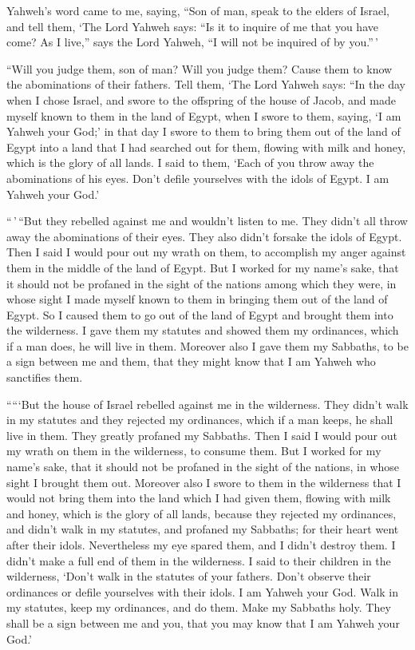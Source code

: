  Yahweh's word came to me, saying,  ``Son of
man, speak to the elders of Israel, and tell them, `The Lord Yahweh
says: ``Is it to inquire of me that you have come? As I live,'' says the
Lord Yahweh, ``I will not be inquired of by you.''\,'

 ``Will you judge them, son of man? Will you judge them?
Cause them to know the abominations of their fathers. 
Tell them, `The Lord Yahweh says: ``In the day when I chose Israel, and
swore to the offspring of the house of Jacob, and made myself known to
them in the land of Egypt, when I swore to them, saying, `I am Yahweh
your God;'  in that day I swore to them to bring them out
of the land of Egypt into a land that I had searched out for them,
flowing with milk and honey, which is the glory of all lands.
 I said to them, `Each of you throw away the abominations
of his eyes. Don't defile yourselves with the idols of Egypt. I am
Yahweh your God.'

 ``\,'\,``But they rebelled against me and wouldn't listen
to me. They didn't all throw away the abominations of their eyes. They
also didn't forsake the idols of Egypt. Then I said I would pour out my
wrath on them, to accomplish my anger against them in the middle of the
land of Egypt.  But I worked for my name's sake, that it
should not be profaned in the sight of the nations among which they
were, in whose sight I made myself known to them in bringing them out of
the land of Egypt.  So I caused them to go out of the
land of Egypt and brought them into the wilderness.  I
gave them my statutes and showed them my ordinances, which if a man
does, he will live in them.  Moreover also I gave them my
Sabbaths, to be a sign between me and them, that they might know that I
am Yahweh who sanctifies them.

 `````But the house of Israel rebelled against me in the
wilderness. They didn't walk in my statutes and they rejected my
ordinances, which if a man keeps, he shall live in them. They greatly
profaned my Sabbaths. Then I said I would pour out my wrath on them in
the wilderness, to consume them.  But I worked for my
name's sake, that it should not be profaned in the sight of the nations,
in whose sight I brought them out.  Moreover also I swore
to them in the wilderness that I would not bring them into the land
which I had given them, flowing with milk and honey, which is the glory
of all lands,  because they rejected my ordinances, and
didn't walk in my statutes, and profaned my Sabbaths; for their heart
went after their idols.  Nevertheless my eye spared them,
and I didn't destroy them. I didn't make a full end of them in the
wilderness.  I said to their children in the wilderness,
`Don't walk in the statutes of your fathers. Don't observe their
ordinances or defile yourselves with their idols.  I am
Yahweh your God. Walk in my statutes, keep my ordinances, and do them.
 Make my Sabbaths holy. They shall be a sign between me
and you, that you may know that I am Yahweh your God.'

